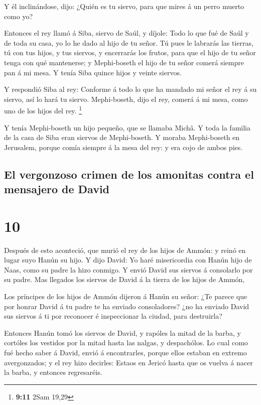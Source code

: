  Y él inclinándose, dijo: ¿Quién es tu siervo, para que
mires á un perro muerto como yo?

 Entonces el rey llamó á Siba, siervo de Saúl, y díjole:
Todo lo que fué de Saúl y de toda su casa, yo lo he dado al hijo de tu
señor.  Tú pues le labrarás las tierras, tú con tus hijos,
y tus siervos, y encerrarás los frutos, para que el hijo de tu señor
tenga con qué mantenerse; y Mephi-boseth el hijo de tu señor comerá
siempre pan á mi mesa. Y tenía Siba quince hijos y veinte siervos.

 Y respondió Siba al rey: Conforme á todo lo que ha mandado
mi señor el rey á su siervo, así lo hará tu siervo. Mephi-boseth, dijo
el rey, comerá á mi mesa, como uno de los hijos del rey. \footnote{\textbf{9:11}
  2Sam 19,29}

 Y tenía Mephi-boseth un hijo pequeño, que se llamaba
Michâ. Y toda la familia de la casa de Siba eran siervos de
Mephi-boseth.  Y moraba Mephi-boseth en Jerusalem, porque
comía siempre á la mesa del rey: y era cojo de ambos pies.

\hypertarget{el-vergonzoso-crimen-de-los-amonitas-contra-el-mensajero-de-david}{%
\subsection{El vergonzoso crimen de los amonitas contra el mensajero de
David}\label{el-vergonzoso-crimen-de-los-amonitas-contra-el-mensajero-de-david}}

\hypertarget{section-9}{%
\section{10}\label{section-9}}

 Después de esto aconteció, que murió el rey de los hijos de
Ammón: y reinó en lugar suyo Hanún su hijo.  Y dijo David:
Yo haré misericordia con Hanún hijo de Naas, como su padre la hizo
conmigo. Y envió David sus siervos á consolarlo por su padre. Mas
llegados los siervos de David á la tierra de los hijos de Ammón,

 Los príncipes de los hijos de Ammón dijeron á Hanún su
señor: ¿Te parece que por honrar David á tu padre te ha enviado
consoladores? ¿no ha enviado David sus siervos á ti por reconocer é
inspeccionar la ciudad, para destruirla?

 Entonces Hanún tomó los siervos de David, y rapóles la
mitad de la barba, y cortóles los vestidos por la mitad hasta las
nalgas, y despachólos.  Lo cual como fué hecho saber á
David, envió á encontrarles, porque ellos estaban en extremo
avergonzados; y el rey hizo decirles: Estaos en Jericó hasta que os
vuelva á nacer la barba, y entonces regresaréis.

